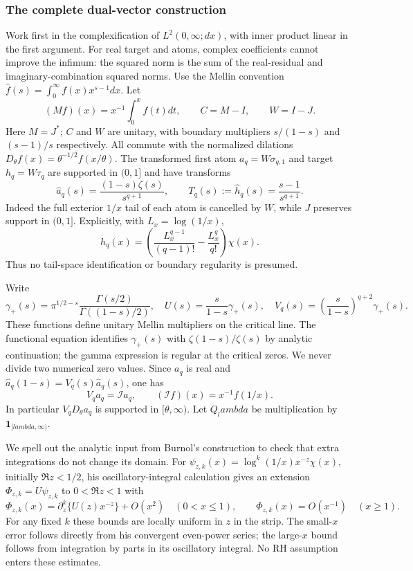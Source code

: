 \documentclass[11pt]{article}
\def\lambda{lambda}%
\theoremstyle{remark}
\begin{document}
\subsubsection*{The complete dual-vector construction}
Work first in the complexification of $L^2(0,\infty;dx)$, with inner
product linear in the first argument. For real target and atoms,
complex coefficients cannot improve the infimum: the squared norm is
the sum of the real-residual and imaginary-combination squared norms.
Use the Mellin convention $\widehat f(s)=\int_0^\infty f(x)x^{s-1}dx$.
Let
\[
 (Mf)(x)=x^{-1}\int_0^x f(t)dt,\qquad C=M-I,\qquad W=I-J.
\]
Here $M=J^*$; $C$ and $W$ are unitary, with boundary multipliers
$s/(1-s)$ and $(s-1)/s$ respectively. All commute with the normalized
dilations $D_\theta f(x)=\theta^{-1/2}f(x/\theta)$.
The transformed first atom $a_q=W\sigma_{q,1}$ and target $h_q=W\tau_q$
are supported in $(0,1]$ and have transforms
\begin{equation}
 \widehat a_q(s)=\frac{(1-s)\zeta(s)}{s^{q+1}},\qquad
 T_q(s):=\widehat h_q(s)=\frac{s-1}{s^{q+1}}.
 \label{eq:ns83-transforms}
\end{equation}
Indeed the full exterior $1/x$ tail of each atom is cancelled by $W$,
while $J$ preserves support in $(0,1]$. Explicitly, with $L_x=\log(1/x)$,
\[
 h_q(x)=\left(\frac{L_x^{q-1}}{(q-1)!}
             -\frac{L_x^q}{q!}\right)\chi(x).
\]
Thus no tail-space identification or boundary regularity is presumed.

Write
\[
 \gamma_+(s)=\pi^{1/2-s}\frac{\Gamma(s/2)}{\Gamma((1-s)/2)},
 \quad U(s)=\frac{s}{1-s}\gamma_+(s),
 \quad V_q(s)=\left(\frac{s}{1-s}\right)^{q+2}\gamma_+(s).
\]
These functions define unitary Mellin multipliers on the critical line.
The functional equation identifies $\gamma_+(s)$ with
$\zeta(1-s)/\zeta(s)$ by analytic continuation; the gamma expression is
regular at the critical zeros. We never divide two numerical zero values.
Since $a_q$ is real and
$\widehat a_q(1-s)=V_q(s)\widehat a_q(s)$, one has
\[
 V_q a_q=\mathcal I a_q,\qquad
 (\mathcal I f)(x)=x^{-1}f(1/x).
\]
In particular $V_qD_\theta a_q$ is supported in $[\theta,\infty)$.
Let $Q_\lambda$ be multiplication by $\mathbf1_{[\lambda,\infty)}$.

We spell out the analytic input from Burnol's construction to check that
extra integrations do not change its domain. For
$\psi_{z,k}(x)=\log^k(1/x)x^{-z}\chi(x)$, initially $\Re z<1/2$,
his oscillatory-integral calculation
\cite[Section 4, especially the expansion preceding Theorem 4.11]{BurnolLower2002}
gives an extension $\Phi_{z,k}=U\psi_{z,k}$ to $0<\Re z<1$ with
\[
 \Phi_{z,k}(x)=\partial_z^k\{U(z)x^{-z}\}+O(x^2)
                   \quad(0<x\leq1),\qquad
 \Phi_{z,k}(x)=O(x^{-1})\quad(x\geq1).
\]
For any fixed $k$ these bounds are locally uniform in $z$ in the strip.
The small-$x$ error follows directly from his convergent even-power
series; the large-$x$ bound follows from integration by parts in its
oscillatory integral. No RH assumption enters these estimates.
\end{document}
